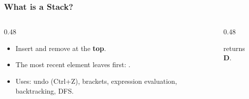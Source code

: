 \documentclass[aspectratio=169,10pt,compress]{beamer}
\begin{document}
\begin{frame}[t,fragile] \frametitle{What is a Stack?}
  \begin{columns}[T]
    \begin{column}{0.48\textwidth}
      \begin{itemize}
        \item Insert and remove at the \textbf{top}.
        \item The most recent element leaves first: .
        \item Uses: undo (Ctrl+Z), brackets, expression evaluation,
              backtracking, DFS.
      \end{itemize}
    \end{column}
    \begin{column}{0.48\textwidth}
      \begin{center}
      \end{center}
      \small {} returns \textbf{D}.
    \end{column}
  \end{columns}
\end{frame}
\end{document}
